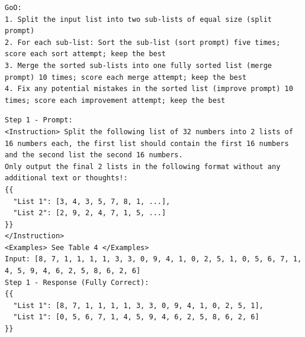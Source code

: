 \documentclass[11pt,UTF8,fontset=fandol]{ctexart}
\begin{document}
\begin{table}[H]\centering
\caption{对 32 元素列表的排序：执行计划（GoO）。}
\label{tab:5}
\end{table}
\begin{lstlisting}
GoO:
1. Split the input list into two sub-lists of equal size (split prompt)
2. For each sub-list: Sort the sub-list (sort prompt) five times; score each sort attempt; keep the best
3. Merge the sorted sub-lists into one fully sorted list (merge prompt) 10 times; score each merge attempt; keep the best
4. Fix any potential mistakes in the sorted list (improve prompt) 10 times; score each improvement attempt; keep the best
\end{lstlisting}

\begin{table}[H]\centering
\caption{对 32 元素列表的排序：第 1 步（提示/回复）。}
\label{tab:6}
\end{table}
\begin{lstlisting}
Step 1 - Prompt:
<Instruction> Split the following list of 32 numbers into 2 lists of 16 numbers each, the first list should contain the first 16 numbers and the second list the second 16 numbers.
Only output the final 2 lists in the following format without any additional text or thoughts!:
{{
  "List 1": [3, 4, 3, 5, 7, 8, 1, ...],
  "List 2": [2, 9, 2, 4, 7, 1, 5, ...]
}}
</Instruction>
<Examples> See Table 4 </Examples>
Input: [8, 7, 1, 1, 1, 1, 3, 3, 0, 9, 4, 1, 0, 2, 5, 1, 0, 5, 6, 7, 1, 4, 5, 9, 4, 6, 2, 5, 8, 6, 2, 6]
Step 1 - Response (Fully Correct):
{{
  "List 1": [8, 7, 1, 1, 1, 1, 3, 3, 0, 9, 4, 1, 0, 2, 5, 1],
  "List 1": [0, 5, 6, 7, 1, 4, 5, 9, 4, 6, 2, 5, 8, 6, 2, 6]
}}
\end{lstlisting}
\end{document}
